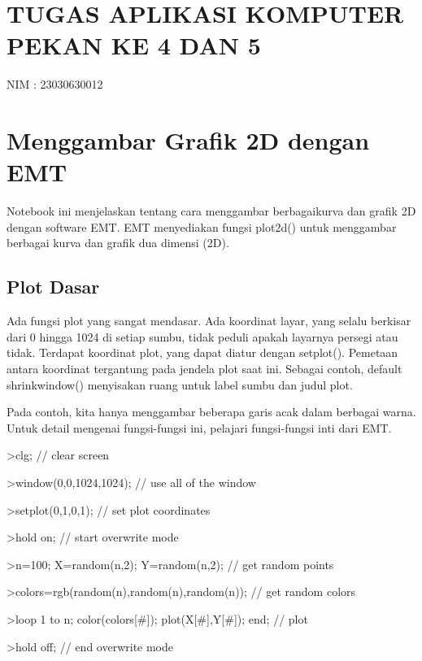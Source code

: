 \documentclass[
]{book}
\author{}
\date{}
\begin{document}
\frontmatter

\mainmatter
\chapter{TUGAS APLIKASI KOMPUTER PEKAN KE 4 DAN 5}\label{tugas-aplikasi-komputer-pekan-ke-4-dan-5}

NIM : 23030630012

\chapter{Menggambar Grafik 2D dengan EMT}\label{menggambar-grafik-2d-dengan-emt}

Notebook ini menjelaskan tentang cara menggambar berbagaikurva dan grafik 2D dengan software EMT. EMT menyediakan fungsi plot2d() untuk menggambar berbagai kurva dan grafik dua dimensi (2D).

\section{Plot Dasar}\label{plot-dasar}

Ada fungsi plot yang sangat mendasar. Ada koordinat layar, yang selalu berkisar dari 0 hingga 1024 di setiap sumbu, tidak peduli apakah layarnya persegi atau tidak. Terdapat koordinat plot, yang dapat diatur dengan setplot(). Pemetaan antara koordinat tergantung pada jendela plot saat ini. Sebagai contoh, default shrinkwindow() menyisakan ruang untuk label sumbu dan judul plot.

Pada contoh, kita hanya menggambar beberapa garis acak dalam berbagai warna. Untuk detail mengenai fungsi-fungsi ini, pelajari fungsi-fungsi inti dari EMT.

\textgreater clg; // clear screen

\textgreater window(0,0,1024,1024); // use all of the window

\textgreater setplot(0,1,0,1); // set plot coordinates

\textgreater hold on; // start overwrite mode

\textgreater n=100; X=random(n,2); Y=random(n,2); // get random points

\textgreater colors=rgb(random(n),random(n),random(n)); // get random colors

\textgreater loop 1 to n; color(colors{[}\#{]}); plot(X{[}\#{]},Y{[}\#{]}); end; // plot

\textgreater hold off; // end overwrite mode
\end{document}
